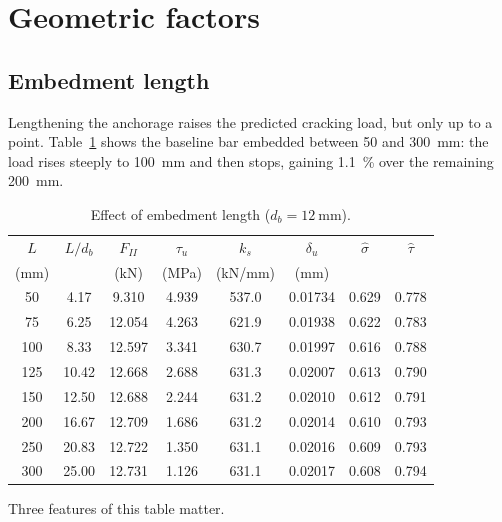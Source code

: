 \newpage
\section{Geometric factors}
\label{sec:geomfactors}

\subsection{Embedment length}
\label{sec:geomL}

Lengthening the anchorage raises the predicted cracking load, but only up to
a point. Table~\ref{tab:sweepL} shows the baseline bar embedded between
\SI{50}{} and \SI{300}{\milli\metre}: the load rises steeply to
\SI{100}{\milli\metre} and then stops, gaining \SI{1.1}{\percent} over the
remaining \SI{200}{\milli\metre}.

\begin{table}[H]
\centering
\caption{Effect of embedment length ($d_b = \SI{12}{\milli\metre}$).}
\label{tab:sweepL}
\small
\begin{tabular*}{\linewidth}{@{\extracolsep{\fill}}cccccccc@{}}
\hline
$L$ & $L/d_b$ & $F_{II}$ & $\tau_u$ & $k_s$ & $\delta_u$
    & $\hat\sigma$ & $\hat\tau$ \\
(mm) &        & (kN)     & (MPa)    & (kN/mm) & (mm) & & \\
\hline
50  & 4.17  & 9.310  & 4.939 & 537.0 & 0.01734 & 0.629 & 0.778 \\
75  & 6.25  & 12.054 & 4.263 & 621.9 & 0.01938 & 0.622 & 0.783 \\
100 & 8.33  & 12.597 & 3.341 & 630.7 & 0.01997 & 0.616 & 0.788 \\
125 & 10.42 & 12.668 & 2.688 & 631.3 & 0.02007 & 0.613 & 0.790 \\
150 & 12.50 & 12.688 & 2.244 & 631.2 & 0.02010 & 0.612 & 0.791 \\
200 & 16.67 & 12.709 & 1.686 & 631.2 & 0.02014 & 0.610 & 0.793 \\
250 & 20.83 & 12.722 & 1.350 & 631.1 & 0.02016 & 0.609 & 0.793 \\
300 & 25.00 & 12.731 & 1.126 & 631.1 & 0.02017 & 0.608 & 0.794 \\
\hline
\end{tabular*}
\end{table}

Three features of this table matter.

